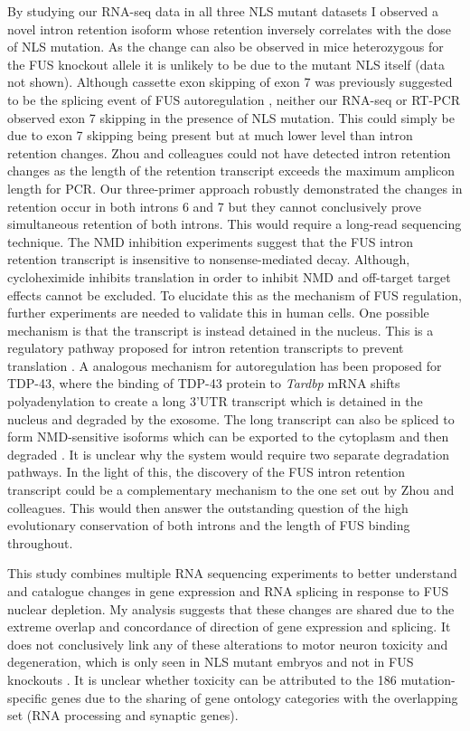 By studying our RNA-seq data in all three NLS mutant datasets I observed a novel intron retention isoform whose retention inversely correlates with the dose of NLS mutation. 
As the change can also be observed in mice heterozygous for the FUS knockout allele it is unlikely to be due to the mutant NLS itself (data not shown).
Although cassette exon skipping of exon 7 was previously suggested to be the splicing event of FUS autoregulation \citep{Zhou2013}, neither our RNA-seq or RT-PCR observed exon 7 skipping in the presence of NLS mutation.
This could simply be due to exon 7 skipping being present but at much lower level than intron retention changes. 
Zhou and colleagues could not have detected intron retention changes as the length of the retention transcript exceeds the maximum amplicon length for PCR. 
Our three-primer approach robustly demonstrated the changes in retention occur in both introns 6 and 7 but they cannot conclusively prove simultaneous retention of both introns. 
This would require a long-read sequencing technique. 
The NMD inhibition experiments suggest that the FUS intron retention transcript is insensitive to nonsense-mediated decay. 
Although, cycloheximide inhibits translation in order to inhibit NMD and off-target target effects cannot be excluded. 
To elucidate this as the mechanism of FUS regulation, further experiments are needed to validate this in human cells.
One possible mechanism is that the transcript is instead detained in the nucleus.
This is a regulatory pathway proposed for intron retention transcripts to prevent translation \citep{Boutz2015}.
A analogous mechanism for autoregulation has been proposed for TDP-43, where the binding of TDP-43 protein to \textit{Tardbp} mRNA shifts polyadenylation to create a long 3'UTR transcript which is detained in the nucleus and degraded by the exosome. The long transcript can also be spliced to form NMD-sensitive isoforms which can be exported to the cytoplasm and then degraded \citep{Ayala2011,Koyama2016}. It is unclear why the system would require two separate degradation pathways. 
In the light of this, the discovery of the FUS intron retention transcript could be a complementary mechanism to the one set out by Zhou and colleagues.
This would then answer the outstanding question of the high evolutionary conservation of both introns and the length of FUS binding throughout.

This study combines multiple RNA sequencing experiments to better understand and catalogue changes in gene expression and RNA splicing in response to FUS nuclear depletion.
My analysis suggests that these changes are shared due to the extreme overlap and concordance of direction of gene expression and splicing.
It does not conclusively link any of these alterations to motor neuron toxicity and degeneration, which is only seen in NLS mutant embryos and not in FUS knockouts \citep{Scekic-zahirovic2016}.
It is unclear whether toxicity can be attributed to the 186 mutation-specific genes due to the sharing of gene ontology categories with the overlapping set (RNA processing and synaptic genes). 

